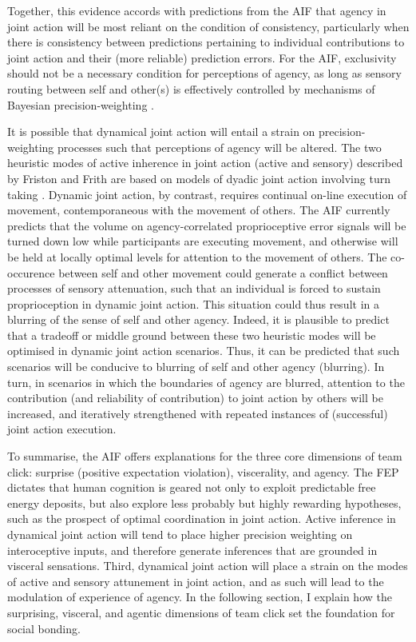 \begin{CJK}{UTF8}{gbsn}
Together, this evidence accords with predictions from the AIF that agency in joint action will be most reliant on the condition of consistency, particularly when there is consistency between predictions pertaining to individual contributions to joint action and their (more reliable) prediction errors.  For the AIF, exclusivity should not be a necessary condition for perceptions of agency, as long as sensory routing between self and other(s) is effectively controlled by mechanisms of Bayesian precision-weighting \citep{Pesquita2017}.

It is possible that dynamical joint action will entail a strain on precision-weighting processes such that perceptions of agency will be altered.  The two heuristic modes of active inherence in joint action (active and sensory) described by Friston and Frith are based on models of dyadic joint action involving turn taking \citep[i.e., in bird song exchanges][]{Friston2015}.  Dynamic joint action, by contrast, requires continual on-line execution of movement, contemporaneous with the movement of others.  The AIF currently predicts that the volume on agency-correlated proprioceptive error signals will be turned down low while participants are executing movement, and otherwise will be held at locally optimal levels for attention to the movement of others.  The co-occurence between self and other movement could generate a conflict between processes of sensory attenuation, such that an individual is forced to sustain proprioception in dynamic joint action. This situation could  thus result in a blurring of the sense of self and other agency.  Indeed, it is plausible to predict that a tradeoff or middle ground between these two heuristic modes will be optimised in dynamic joint action scenarios. Thus, it can be predicted that such scenarios will be conducive to blurring of self and other agency (blurring). In turn, in scenarios in which the boundaries of agency are blurred, attention to the contribution (and reliability of contribution) to joint action by others will be increased, and iteratively strengthened with repeated instances of (successful) joint action execution.

To summarise, the AIF offers explanations for the three core dimensions of team click: surprise (positive expectation violation), viscerality, and agency.  The FEP dictates that human cognition is geared not only to exploit predictable free energy deposits, but also explore less probably but highly rewarding hypotheses, such as the prospect of optimal coordination in joint action.  Active inference in dynamical joint action will tend to place higher precision weighting on interoceptive inputs, and therefore generate inferences that are grounded in visceral sensations.  Third, dynamical joint action will place a strain on the modes of active and sensory attunement in joint action, and as such will lead to the modulation of experience of agency.   In the following section, I explain how the surprising, visceral, and agentic dimensions of team click set the foundation for social bonding.













\end{CJK}
